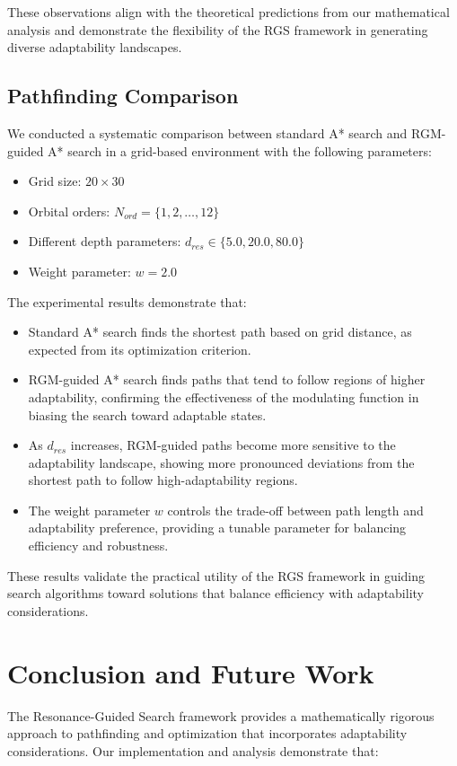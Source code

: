 \documentclass{article}
\begin{document}
These observations align with the theoretical predictions from our mathematical analysis and demonstrate the flexibility of the RGS framework in generating diverse adaptability landscapes.

\subsection{Pathfinding Comparison}
We conducted a systematic comparison between standard A* search and RGM-guided A* search in a grid-based environment with the following parameters:
\begin{itemize}
    \item Grid size: $20 \times 30$
    \item Orbital orders: $N_{ord} = \{1, 2, \ldots, 12\}$
    \item Different depth parameters: $d_{res} \in \{5.0, 20.0, 80.0\}$
    \item Weight parameter: $w = 2.0$
\end{itemize}

The experimental results demonstrate that:
\begin{itemize}
    \item Standard A* search finds the shortest path based on grid distance, as expected from its optimization criterion.
    \item RGM-guided A* search finds paths that tend to follow regions of higher adaptability, confirming the effectiveness of the modulating function in biasing the search toward adaptable states.
    \item As $d_{res}$ increases, RGM-guided paths become more sensitive to the adaptability landscape, showing more pronounced deviations from the shortest path to follow high-adaptability regions.
    \item The weight parameter $w$ controls the trade-off between path length and adaptability preference, providing a tunable parameter for balancing efficiency and robustness.
\end{itemize}

These results validate the practical utility of the RGS framework in guiding search algorithms toward solutions that balance efficiency with adaptability considerations.

\section{Conclusion and Future Work}
The Resonance-Guided Search framework provides a mathematically rigorous approach to pathfinding and optimization that incorporates adaptability considerations. Our implementation and analysis demonstrate that:
\end{document}
